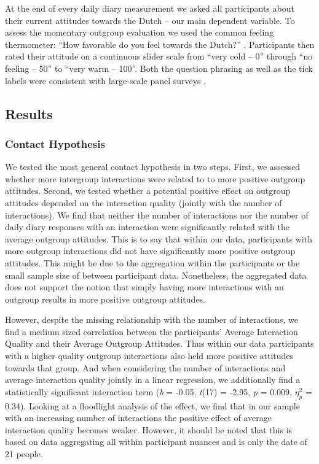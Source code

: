 At the end of every daily diary measurement we asked all participants
about their current attitudes towards the Dutch -- our main dependent
variable. To assess the momentary outgroup evaluation we used the common
feeling thermometer: ``How favorable do you feel towards the Dutch?''
\citep[][]{Lavrakas2008}. Participants then rated their attitude on a
continuous slider scale from ``very cold -- 0'' through ``no feeling --
50'' to ``very warm -- 100''. Both the question phrasing as well as the
tick labels were consistent with large-scale panel surveys
\citep[e.g.,][]{DeBell2010}.




\subsection{Results}

\subsubsection{Contact Hypothesis}

We tested the most general contact hypothesis in two steps. First, we
assessed whether more intergroup interactions were related to to more
positive outgroup attitudes. Second, we tested whether a potential
positive effect on outgroup attitudes depended on the interaction
quality (jointly with the number of interactions). We find that neither
the number of interactions nor the number of daily diary responses with
an interaction were significantly related with the average outgroup
attitudes. This is to say that within our data, participants with more
outgroup interactions did not have significantly more positive outgroup
attitudes. This might be due to the aggregation within the participants
or the small sample size of between participant data. Nonetheless, the
aggregated data does not support the notion that simply having more
interactions with an outgroup results in more positive outgroup
attitudes.

However, despite the missing relationship with the number of
interactions, we find a medium sized correlation between the
participants' Average Interaction Quality and their Average Outgroup
Attitudes. Thus within our data participants with a higher quality
outgroup interactions also held more positive attitudes towards that
group. And when considering the number of interactions and average
interaction quality jointly in a linear regression, we additionally find
a statistically significant interaction term (\textit{b} = -0.05,
\textit{t}(17) = -2.95, \textit{p} = 0.009, \(\eta_p^2\) = 0.34).
Looking at a floodlight analysis of the effect, we find that in our
sample with an increasing number of interactions the positive effect of
average interaction quality becomes weaker. However, it should be noted
that this is based on data aggregating all within participant nuances
and is only the date of 21 people.

